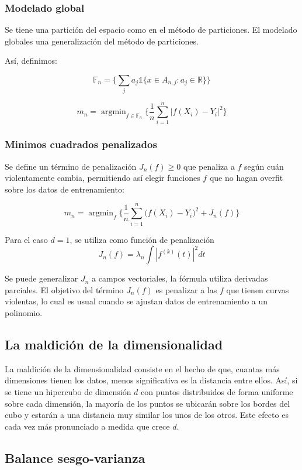 \documentclass[12pt, a4paper]{article}
\begin{document}
\subsubsection{Modelado global}

Se tiene una partición del espacio como en el método de particiones. El modelado globales una generalización del método de particiones.

Así, definimos:

$$ \mathds{F}_n = \Bigg \{ \sum_{j} a_j \mathds{1} \{ x \in A_{n,j}: a_j \in \mathds{R} \} \Bigg \} $$

$$ m_n = \mathop{argmin}_{f\in \mathds{F}_n} \Bigg \{ \frac{1}{n} \sum_{i=1}^n | f(X_i)-Y_i |^2 \Bigg \} $$

\subsubsection{Minimos cuadrados penalizados}

Se define un término de penalización $J_n(f)\geq 0$ que penaliza a $f$ según cuán violentamente cambia, permitiendo así elegir funciones $f$ que no hagan overfit sobre los datos de entrenamiento:

$$ m_n=\mathop{argmin}_f \Bigg \{ \frac{1}{n} \sum_{i=1}^n \big (f(X_i)-Y_i \big )^2 + J_n(f) \Bigg \} $$

Para el caso $d=1$, se utiliza como función de penalización $$ J_n(f)=\lambda_n \int |f^{(k)}(t)|^2 dt $$

Se puede generalizar $J_n$ a campos vectoriales, la fórmula utiliza derivadas parciales. El objetivo del término $J_n(f)$ es penalizar a las $f$ que tienen curvas violentas, lo cual es usual cuando se ajustan datos de entrenamiento a un polinomio.

\subsection{La maldición de la dimensionalidad}

La maldición de la dimensionalidad consiste en el hecho de que, cuantas más dimensiones tienen los datos, menos significativa es la distancia entre ellos. Así, si se tiene un hipercubo de dimensión $d$ con puntos distribuidos de forma uniforme sobre cada dimensión, la mayoría de los puntos se ubicarán sobre los bordes del cubo y estarán a una distancia muy similar los unos de los otros. Este efecto es cada vez más pronunciado a medida que crece $d$.

\subsection{Balance sesgo-varianza}
\end{document}
